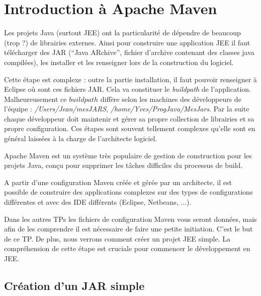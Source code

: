 \documentclass[a4,12pt]{article}
\begin{document}




\section{Introduction à Apache Maven}

Les projets Java (surtout JEE) ont la particularité de dépendre de beaucoup (trop ?) de librairies externes.  Ainsi pour construire une application JEE il faut télécharger des JAR (``Java ARchive'', fichier d'archive contenant des classes java compilées), les installer et les renseigner lors de la construction du logiciel. 

Cette étape est complexe : outre la partie installation, il faut pouvoir renseigner à Eclipse où sont ces fichiers JAR.  Cela va constituer le \emph{buildpath} de l'application. Malheureusement ce $buildpath$ diffère selon les machines des développeurs de l'équipe : \emph{/Users/Jean/mesJARS}, \emph{/home/Yves/ProgJava/MesJars}. Par la suite chaque développeur doit maintenir et gérer sa propre collection de librairies et sa propre configuration. Ces étapes sont souvent tellement complexes qu'elle sont en général laissées à la charge de l'architecte logiciel.

Apache Maven est un système très populaire de gestion de construction pour les projets Java, conçu pour supprimer les tâches difficiles du processus de build.  

A partir d'une configuration Maven créée et gérée par un architecte, il est possible de construire des applications complexes sur des types de configurations différentes et avec des IDE différents (Eclipse, Netbeans, ...).

Dans les autres TPs les fichiers de configuration Maven vous seront données, mais afin de les comprendre il est nécessaire de faire une petite initiation. C'est le but de ce TP. De plus, nous verrons comment créer un projet JEE simple. La compréhension de cette étape est cruciale pour commencer le développement en JEE.

\subsection{Création d'un JAR simple}
\end{document}
